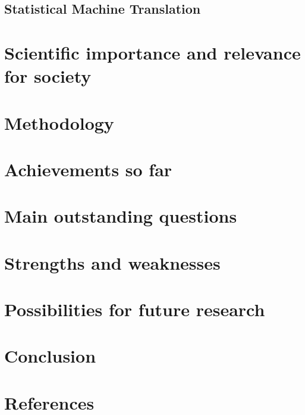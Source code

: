\documentclass[12pt]{article}
\begin{document}

\subsection{Statistical Machine Translation}












\section{Scientific importance and relevance for society}


\section{Methodology}


\section{Achievements so far}
\section{Main outstanding questions}
\section{Strengths and weaknesses}
\section{Possibilities for future research}
\section{Conclusion}

\section{References}

\end{document}
